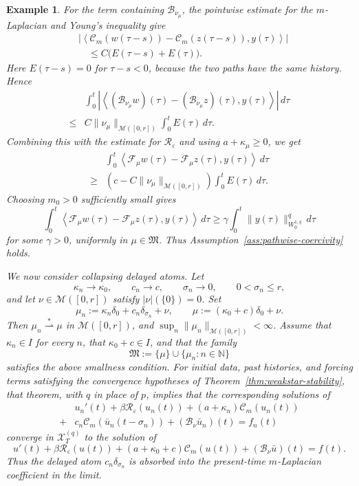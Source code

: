 \documentclass[a4paper,11pt,oneside,reqno]{amsart}
\newtheorem{example}[theorem]{Example}
\newcounter{c}
\newcounter{d}
\newcounter{b}
\newcommand{\dual}[2]{\left\langle #1,#2\right\rangle}
\newcommand{\M}{\mathcal{M}}
\newcommand{\KM}{\mathfrak{M}}
\begin{document}
\begin{example}
For the term containing \(\mathcal B_{\nu_\mu}\), the pointwise estimate for
the \(m\)-Laplacian and Young's inequality give
\[
\begin{aligned}
&\left|
\dual{
 \mathcal C_m(w(\tau-s))-\mathcal C_m(z(\tau-s))
}{
 y(\tau)
}
\right|  \\
&\quad\le
 C\bigl(E(\tau-s)+E(\tau)\bigr).
\end{aligned}
\]
Here \(E(\tau-s)=0\) for \(\tau-s<0\), because the two paths have the same
history. Hence
\[
\begin{aligned}
&\int_0^t
 \left|
 \dual{
  (\mathcal B_{\nu_\mu}w)(\tau)-(\mathcal B_{\nu_\mu}z)(\tau)
 }{
  y(\tau)
 }
 \right|\,d\tau  \\
\le{}&
 C\|\nu_\mu\|_{\M([0,r])}
 \int_0^t E(\tau)\,d\tau .
\end{aligned}
\]
Combining this with the estimate for \(\mathcal R_\varepsilon\) and using
\(a+\kappa_\mu\ge0\), we get
\[
\begin{aligned}
&\int_0^t
 \dual{
 \mathcal F_\mu w(\tau)-\mathcal F_\mu z(\tau)
 }{
  y(\tau)
 }\,d\tau  \\
\ge{}&
 \left(c-C\|\nu_\mu\|_{\M([0,r])}\right)
 \int_0^t E(\tau)\,d\tau .
\end{aligned}
\]
Choosing \(m_0>0\) sufficiently small gives
\[
\int_0^t
 \dual{
 \mathcal F_\mu w(\tau)-\mathcal F_\mu z(\tau)
 }{
  y(\tau)
 }\,d\tau
 \ge
 \gamma\int_0^t \|y(\tau)\|_{W^{1,q}_0}^{q}\,d\tau
\]
for some \(\gamma>0\), uniformly in \(\mu\in\KM\). Thus
Assumption~\ref{ass:pathwise-coercivity} holds.

We now consider collapsing delayed atoms. Let
\[
 \kappa_n\to\kappa_0,\qquad c_n\to c,\qquad \sigma_n\to0,
 \qquad 0<\sigma_n\le r,
\]
and let \(\nu\in\M([0,r])\) satisfy \(|\nu|(\{0\})=0\). Set
\[
 \mu_n:=\kappa_n\delta_0+c_n\delta_{\sigma_n}+\nu,
 \qquad
 \mu:=(\kappa_0+c)\delta_0+\nu .
\]
Then \(\mu_n\stackrel{*}{\rightharpoonup}\mu\) in \(\M([0,r])\), and
\(\sup_n\|\mu_n\|_{\M([0,r])}<\infty\). Assume that \(\kappa_n\in I\) for every \(n\), that
\(\kappa_0+c\in I\), and that the family
\[
 \KM:=\{\mu\}\cup\{\mu_n:n\in\mathbb N\}
\]
satisfies the above smallness condition. For initial data, past histories,
and forcing terms satisfying the convergence hypotheses of
Theorem~\ref{thm:weakstar-stability}, that theorem, with \(q\) in place of
\(p\), implies that the corresponding solutions of
\[
\begin{aligned}
 &u_n'(t)+\beta\mathcal R_\varepsilon(u_n(t))
 +(a+\kappa_n)\mathcal C_m(u_n(t))  \\
 +&c_n\mathcal C_m(\bar u_n(t-\sigma_n))
 +(\mathcal B_\nu\bar u_n)(t)=f_n(t)
\end{aligned}
\]
converge in \(\mathcal X_T^{(q)}\) to the solution of
\[
 u'(t)+\beta\mathcal R_\varepsilon(u(t))
 +(a+\kappa_0+c)\mathcal C_m(u(t))
 +(\mathcal B_\nu\bar u)(t)=f(t).
\]
Thus the delayed atom \(c_n\delta_{\sigma_n}\) is absorbed into the
present-time \(m\)-Laplacian coefficient in the limit.
\end{example}
\end{document}
